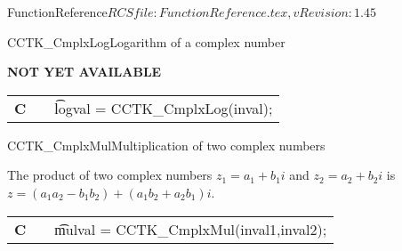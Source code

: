 \begin{cactuspart}{5}{FunctionReference}{$RCSfile: FunctionReference.tex,v $}{$Revision: 1.45 $}
\begin{CCTKFunc}{CCTK\_CmplxLog}{Logarithm of a complex number}
\label{CCTK-CmplxLog}
\showcargs
\begin{params}
\end{params}
\begin{discussion}
{\bf NOT YET AVAILABLE}
\end{discussion}
\begin{examples}
\begin{tabular}{@{}p{3cm}cp{11cm}}
\hfill {\bf C} && {\t logval = CCTK\_CmplxLog(inval)};
\end{tabular}
\end{examples}
\begin{errorcodes}
\end{errorcodes}
\end{CCTKFunc}

\begin{CCTKFunc}{CCTK\_CmplxMul}{Multiplication of two complex numbers}
\label{CCTK-CmplxMul}
\showcargs
\begin{params}
\end{params}
\begin{discussion}
The product of two complex numbers $z_1=a_1+b_1 i$ and $z_2=a_2+b_2 i$ is
$z=(a_1 a_2 - b_1 b_2) + (a_1 b_2 + a_2 b_1)i$.
\end{discussion}
\begin{examples}
\begin{tabular}{@{}p{3cm}cp{11cm}}
\hfill {\bf C} && {\t mulval = CCTK\_CmplxMul(inval1,inval2)};
\end{tabular}
\end{examples}
\begin{errorcodes}
\end{errorcodes}
\end{CCTKFunc}




\end{cactuspart}
